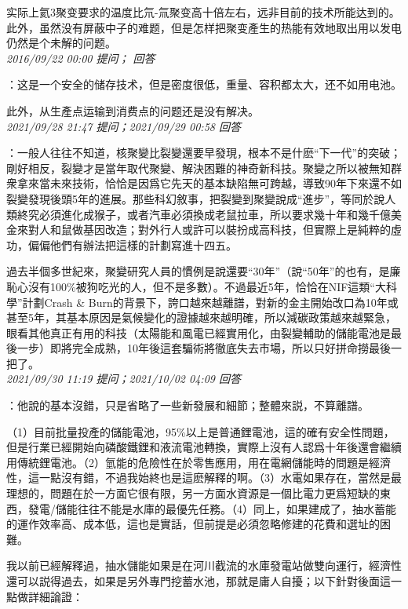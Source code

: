 \documentclass[twocolumn]{ctexart}
\begin{document}
实际上氦3聚变要求的温度比氘-氚聚变高十倍左右，远非目前的技术所能达到的。此外，虽然没有屏蔽中子的难题，但是怎样把聚变產生的热能有效地取出用以发电仍然是个未解的问题。\\

\textit{\hfill\noindent\small 2016/09/22 00:00 提问； 回答}

：这是一个安全的储存技术，但是密度很低，重量、容积都太大，还不如用电池。

此外，从生產点运输到消费点的问题还是没有解决。\\

\textit{\hfill\noindent\small 2021/09/28 21:47 提问；2021/09/29 00:58 回答}

：一般人往往不知道，核聚變比裂變還要早發現，根本不是什麽“下一代”的突破；剛好相反，裂變才是當年取代聚變、解決困難的神奇新科技。聚變之所以被無知群衆拿來當未來技術，恰恰是因爲它先天的基本缺陷無可跨越，導致90年下來還不如裂變發現後頭5年的進展。那些科幻敘事，把裂變到聚變說成“進步”，等同於說人類終究必須進化成猴子，或者汽車必須換成老鼠拉車，所以要求幾十年和幾千億美金來對人和鼠做基因改造；對外行人或許可以裝扮成高科技，但實際上是純粹的虛功，偏偏他們有辦法把這樣的計劃寫進十四五。

過去半個多世紀來，聚變研究人員的慣例是說還要“30年”（說“50年”的也有，是廉恥心沒有100\%被狗吃光的人，但不是多數）。不過最近5年，恰恰在NIF這類“大科學”計劃Crash \& Burn的背景下，誇口越來越離譜，對新的金主開始改口為10年或甚至5年，其基本原因是氣候變化的證據越來越明確，所以減碳政策越來越緊急，眼看其他真正有用的科技（太陽能和風電已經實用化，由裂變輔助的儲能電池是最後一步）即將完全成熟，10年後這套騙術將徹底失去市場，所以只好拼命撈最後一把了。
\\

\textit{\hfill\noindent\small 2021/09/30 11:19 提问；2021/10/02 04:09 回答}

：他說的基本沒錯，只是省略了一些新發展和細節；整體來説，不算離譜。

（1）目前批量投產的儲能電池，95\%以上是普通鋰電池，這的確有安全性問題，但是行業已經開始向磷酸鐵鋰和液流電池轉換，實際上沒有人認爲十年後還會繼續用傳統鋰電池。（2）氫能的危險性在於零售應用，用在電網儲能時的問題是經濟性，這一點沒有錯，不過我始終也是這麽解釋的啊。（3）水電如果存在，當然是最理想的，問題在於一方面它很有限，另一方面水資源是一個比電力更爲短缺的東西，發電/儲能往往不能是水庫的最優先任務。（4）同上，如果建成了，抽水蓄能的運作效率高、成本低，這也是實話，但前提是必須忽略修建的花費和選址的困難。

我以前已經解釋過，抽水儲能如果是在河川截流的水庫發電站做雙向運行，經濟性還可以説得過去，如果是另外專門挖蓄水池，那就是庸人自擾；以下針對後面這一點做詳細論證：
\end{document}

